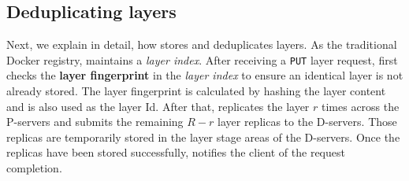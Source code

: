 \subsection{Deduplicating layers}
\label{sec:dedup-desgin}

%
%


Next, we explain in detail, how \sysname stores and deduplicates layers.
%
%
As the traditional Docker registry, \sysname maintains a \emph{layer index}.
After receiving a \texttt{PUT} layer request,
\sysname first checks the \textbf{layer fingerprint} in the \emph{layer index} to ensure 
an identical layer is not already stored.
The layer fingerprint is calculated by hashing the layer content 
and is also used as the layer Id.
After that, \sysname replicates the layer $r$ times across the P-servers
and submits the remaining $R-r$ layer replicas to the D-servers. Those replicas are
temporarily stored in the layer stage areas of the D-servers. Once the replicas
have been stored successfully, \sysname notifies the client of the request completion.
%

